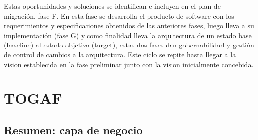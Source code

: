 Estas oportunidades y soluciones se identifican e incluyen en el plan de migración, fase F. En esta fase se desarrolla el producto de software con los requerimientos y especificaciones obtenidos de las anteriores fases, luego lleva a su implementación (fase G) y como finalidad lleva la arquitectura de un estado base (baseline) al estado objetivo (target), estas dos fases dan gobernabilidad y gestión de control de cambios a la arquitectura. Este ciclo se repite hasta llegar a la vision establecida en la fase preliminar junto con la vision inicialmente concebida.


\section{TOGAF}
\subsection{Resumen: capa de negocio}

